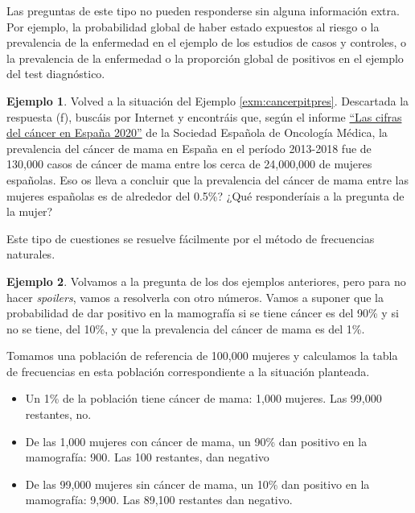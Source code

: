 \documentclass[
]{book}
\theoremstyle{definition}
\theoremstyle{definition}
\newtheorem{example}{Ejemplo}[chapter]
\theoremstyle{definition}
\theoremstyle{definition}
\theoremstyle{remark}
\begin{document}
Las preguntas de este tipo no pueden responderse sin alguna información extra. Por ejemplo, la probabilidad global de haber estado expuestos al riesgo o la prevalencia de la enfermedad en el ejemplo de los estudios de casos y controles, o la prevalencia de la enfermedad o la proporción global de positivos en el ejemplo del test diagnóstico.

\begin{example}
\protect\hypertarget{exm:cancerpitpres2}{}\label{exm:cancerpitpres2}Volved a la situación del Ejemplo \ref{exm:cancerpitpres}. Descartada la respuesta (f), buscáis por Internet y encontráis que, según el informe \href{https://seom.org/seomcms/images/stories/recursos/Cifras_del_cancer_2020.pdf}{``Las cifras del cáncer en España 2020''} de la Sociedad Española de Oncología Médica, la prevalencia del cáncer de mama en España en el período 2013-2018 fue de 130,000 casos de cáncer de mama entre los cerca de 24,000,000 de mujeres españolas. Eso os lleva a concluir que la prevalencia del cáncer de mama entre las mujeres españolas es de alrededor del 0.5\%? ¿Qué responderíais a la pregunta de la mujer?
\end{example}

Este tipo de cuestiones se resuelve fácilmente por el método de frecuencias naturales.

\begin{example}
\protect\hypertarget{exm:cancerpitpres3}{}\label{exm:cancerpitpres3}Volvamos a la pregunta de los dos ejemplos anteriores, pero para no hacer \emph{spoilers}, vamos a resolverla con otro números. Vamos a suponer que la probabilidad de dar positivo en la mamografía si se tiene cáncer es del 90\% y si no se tiene, del 10\%, y que la prevalencia del cáncer de mama es del 1\%.
\end{example}

Tomamos una población de referencia de 100,000 mujeres y calculamos la tabla de frecuencias en esta población correspondiente a la situación planteada.

\begin{itemize}
\item
  Un 1\% de la población tiene cáncer de mama: 1,000 mujeres. Las 99,000 restantes, no.
\item
  De las 1,000 mujeres con cáncer de mama, un 90\% dan positivo en la mamografía: 900. Las 100 restantes, dan negativo
\item
  De las 99,000 mujeres sin cáncer de mama, un 10\% dan positivo en la mamografía: 9,900. Las 89,100 restantes dan negativo.
\end{itemize}
\end{document}
